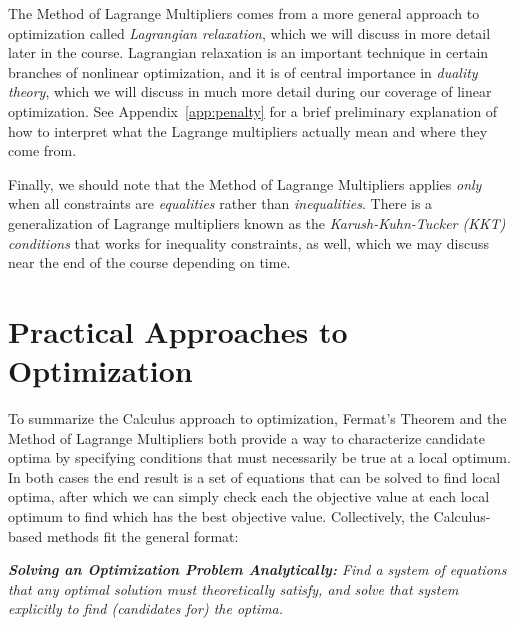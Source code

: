 \documentclass[11pt]{article}
\theoremstyle{definition} %
\begin{document}
The Method of Lagrange Multipliers comes from a more general approach to optimization called \textit{Lagrangian relaxation}, which we will discuss in more detail later in the course. Lagrangian relaxation is an important technique in certain branches of nonlinear optimization, and it is of central importance in \textit{duality theory}, which we will discuss in much more detail during our coverage of linear optimization. See Appendix~\ref{app:penalty} for a brief preliminary explanation of how to interpret what the Lagrange multipliers actually mean and where they come from.

Finally, we should note that the Method of Lagrange Multipliers applies \textit{only} when all constraints are \textit{equalities} rather than \textit{inequalities}. There is a generalization of Lagrange multipliers known as the \textit{Karush-Kuhn-Tucker (KKT) conditions} that works for inequality constraints, as well, which we may discuss near the end of the course depending on time. 

\newpage
\section{Practical Approaches to Optimization}
\label{sec:approaches}

To summarize the Calculus approach to optimization, Fermat's Theorem and the Method of Lagrange Multipliers both provide a way to characterize candidate optima by specifying conditions that must necessarily be true at a local optimum. In both cases the end result is a set of equations that can be solved to find local optima, after which we can simply check each the objective value at each local optimum to find which has the best objective value. Collectively, the Calculus-based methods fit the general format:

\textit{\textbf{Solving an Optimization Problem Analytically:} Find a system of equations that any optimal solution must theoretically satisfy, and solve that system explicitly to find (candidates for) the optima.}
\end{document}
